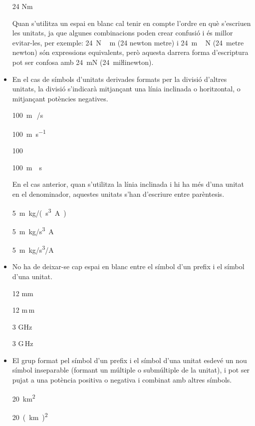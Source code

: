 \begin{itemize}
\textcolor{Red}\faTimesCircle{} 24 Nm

Quan s'utilitza un espai en blanc cal tenir en compte  l'ordre en què s'escriuen
les unitats, ja que algunes combinacions poden crear confusió i
és millor evitar-les, per exemple: \SI{24}{N\,m} (24 newton metre) i
\SI{24}{m\,N} (24~metre newton) són expressions equivalents, però
aquesta darrera forma d'escriptura pot ser confosa amb \SI{24}{mN} (24~miŀlinewton).

\item En el cas de símbols d'unitats derivades formats per la divisió
d'altres unitats, la divisió s'indicarà mitjançant una línia
inclinada o horitzontal, o mitjançant potències negatives.

\textcolor{Green}\faCheckSquare{} \SI{100}{m\,/s}

\textcolor{Green}\faCheckSquare{} \SI{100}{m.s^{-1}}

\textcolor{Green}\faCheckSquare{} \SI{100}{}

\textcolor{Red}\faTimesCircle{} \SI{100}{m\div s}

En el cas anterior, quan s'utilitza la línia inclinada i hi ha més
d'una unitat en el denominador, aquestes unitats s'han d'escriure
entre parèntesis.

\textcolor{Green}\faCheckSquare{} \SI{5}{m.kg/(s^3.A)}

\textcolor{Red}\faTimesCircle{} \SI{5}{m.kg/s^3.A}

\textcolor{Red}\faTimesCircle{} \SI{5}{m.kg/s^3/A}


\item No ha de deixar-se cap espai en blanc entre el símbol d'un prefix i
el símbol d'una unitat.

\textcolor{Green}\faCheckSquare{} 12 mm

\textcolor{Red}\faTimesCircle{} 12 m\,m

\textcolor{Green}\faCheckSquare{}  3 GHz

\textcolor{Red}\faTimesCircle{}  3 G\,Hz


\item El grup format pel símbol d'un prefix i el símbol d'una unitat
esdevé un nou símbol inseparable (formant un múltiple o submúltiple
de la unitat), i pot ser pujat a una potència positiva o negativa i
combinat amb altres símbols.

\textcolor{Green}\faCheckSquare{} \SI{20}{km^2}

\textcolor{Red}\faTimesCircle{} \SI{20}{(km)^2}


\end{itemize}
